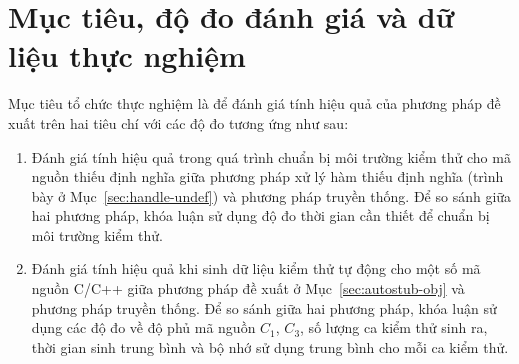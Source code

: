 

\section{Mục tiêu, độ đo đánh giá và dữ liệu thực nghiệm}
Mục tiêu tổ chức thực nghiệm là để đánh giá tính hiệu quả của phương pháp đề xuất trên hai tiêu chí với các độ đo tương ứng như sau:
\begin{enumerate}
    \item Đánh giá tính hiệu quả trong quá trình chuẩn bị môi trường kiểm thử cho mã nguồn thiếu định nghĩa giữa phương pháp xử lý hàm thiếu định nghĩa (trình bày ở Mục~\ref{sec:handle-undef}) và phương pháp truyền thống. Để so sánh giữa hai phương pháp, khóa luận sử dụng độ đo thời gian cần thiết để chuẩn bị môi trường kiểm thử.
    \item Đánh giá tính hiệu quả khi sinh dữ liệu kiểm thử tự động cho một số mã nguồn C/C++ giữa phương pháp đề xuất ở Mục~\ref{sec:autostub-obj} và phương pháp truyền thống. Để so sánh giữa hai phương pháp, khóa luận sử dụng các độ đo về độ phủ mã nguồn $C_1$, $C_3$, số lượng ca kiểm thử sinh ra, thời gian sinh trung bình và bộ nhớ sử dụng trung bình cho mỗi ca kiểm thử.
\end{enumerate}


